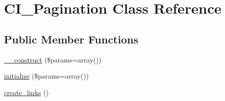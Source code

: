 \hypertarget{class_c_i___pagination}{\section{C\-I\-\_\-\-Pagination Class Reference}
\label{class_c_i___pagination}
}
\subsection*{Public Member Functions}
\begin{DoxyCompactItemize}
\item 
\hyperlink{class_c_i___pagination_a568ecdb0d73d2a870f33189739922a50}{\-\_\-\-\_\-construct} (\$params=array())
\item 
\hyperlink{class_c_i___pagination_ae411a67cc3ac31622373c65c71b66c66}{initialize} (\$params=array())
\item 
\hyperlink{class_c_i___pagination_afd580f4d296b1d416d2b4b03edef3bc5}{create\-\_\-links} ()
\end{DoxyCompactItemize}
